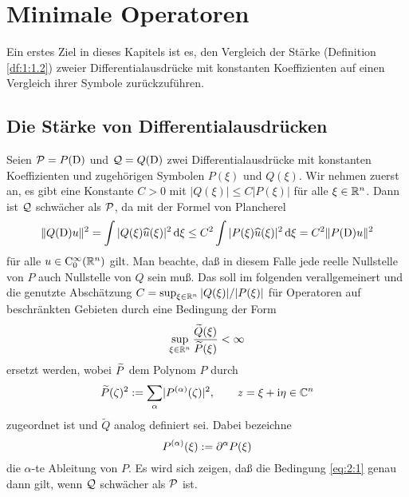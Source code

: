 \chapter{Minimale Operatoren}

Ein erstes Ziel in dieses Kapitels ist es, den Vergleich der Stärke (Definition \ref{df:1:1.2})
zweier Differentialausdrücke mit konstanten Koeffizienten auf einen Vergleich ihrer Symbole zurückzuführen.

\section{Die Stärke von Differentialausdrücken}

Seien $\mathcal P=P(\mathrm D)$ und $\mathcal Q=Q(\mathrm D)$ zwei Differentialausdrücke mit konstanten Koeffizienten und zugehörigen Symbolen $P(\xi)$ und $Q(\xi)$. Wir nehmen zuerst an, es gibt eine Konstante $C>0$ mit $|Q(\xi)|\le C|P(\xi)|$ für alle $\xi\in\mathbb R^n$. Dann ist $\mathcal Q$ schwächer als $\mathcal P$, da mit der Formel von Plancherel 
\begin{equation}
    \|Q(\mathrm D) u\|^2 = \int |Q(\xi)\widehat u(\xi)|^2 \,\mathrm d\xi \le C^2 \int |P(\xi)\widehat u(\xi)|^2 \,\mathrm d\xi = C^2 \|P(\mathrm D)u \|^2 
\end{equation}
für alle $u\in\mathrm C_0^\infty(\mathbb R^n)$ gilt. Man beachte, daß in diesem Falle jede reelle Nullstelle von $P$ auch Nullstelle von $Q$ sein muß. Das soll im folgenden verallgemeinert und die genutzte Abschätzung $C=\sup_{\xi\in\mathbb R^n} |Q(\xi)|/|P(\xi)|$ für Operatoren auf beschränkten Gebieten  durch eine Bedingung der Form
\begin{equation}\label{eq:2:1}
\sup_{\xi\in\mathbb R^n}\frac{\widetilde{Q}(\xi)}{\widetilde{P}(\xi)}<\infty
\end{equation}
ersetzt werden, wobei $\widetilde{P}$ dem Polynom $P$ durch
\begin{equation}\label{eq:2:2}
\widetilde{P}(\zeta)^2:=\sum_\alpha\lvert P^{(\alpha)}(\zeta)\rvert^2,\qquad z=\xi+\mathrm i\eta \in\mathbb C^n
\end{equation}
zugeordnet ist und $\widetilde Q$ analog definiert sei. Dabei bezeichne 
\begin{equation}
P^{(\alpha)}(\xi):=\partial^\alpha P(\xi)
\end{equation}
die $\alpha$-te Ableitung von $P$. Es wird sich zeigen, daß die Bedingung \eqref{eq:2:1} genau dann gilt, wenn $\mathcal Q$ schwächer als $\mathcal P$ ist.

